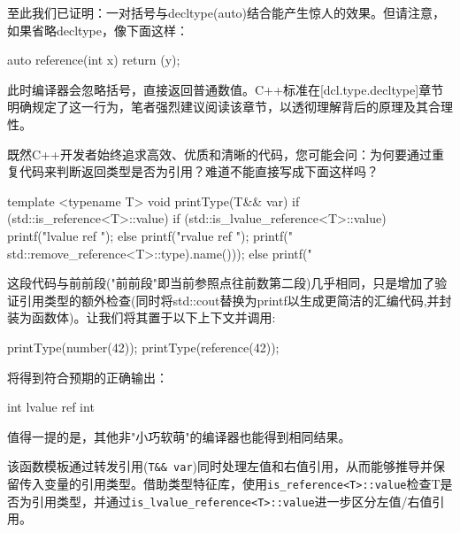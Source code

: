 至此我们已证明：一对括号与decltype(auto)结合能产生惊人的效果。但请注意，如果省略decltype，像下面这样：

\begin{cpp}
auto reference(int x) {
  return (y);
}
\end{cpp}

此时编译器会忽略括号，直接返回普通数值。C++标准在[dcl.type.decltype]章节明确规定了这一行为，笔者强烈建议阅读该章节，以透彻理解背后的原理及其合理性。

既然C++开发者始终追求高效、优质和清晰的代码，您可能会问：为何要通过重复代码来判断返回类型是否为引用？难道不能直接写成下面这样吗？

\begin{cpp}
template <typename T>
void printType(T&& var) {
  if (std::is_reference<T>::value) {
    if (std::is_lvalue_reference<T>::value) {
      printf("lvalue ref ");
    } else {
      printf("rvalue ref ");
    }
    printf("%
    std::remove_reference<T>::type).name()));
  } else {
    printf("%
  }
}
\end{cpp}

这段代码与前前段("前前段"即当前参照点往前数第二段)几乎相同，只是增加了验证引用类型的额外检查(同时将std::cout替换为printf以生成更简洁的汇编代码,并封装为函数体)。让我们将其置于以下上下文并调用:

\begin{cpp}
printType(number(42));
printType(reference(42));
\end{cpp}

将得到符合预期的正确输出：

\begin{shell}
int
lvalue ref int
\end{shell}

值得一提的是，其他非"小巧软萌"的编译器也能得到相同结果。

该函数模板通过转发引用(\verb|T&& var|)同时处理左值和右值引用，从而能够推导并保留传入变量的引用类型。借助类型特征库，使用\verb|is_reference<T>::value|检查T是否为引用类型，并通过\verb|is_lvalue_reference<T>::value|进一步区分左值/右值引用。

